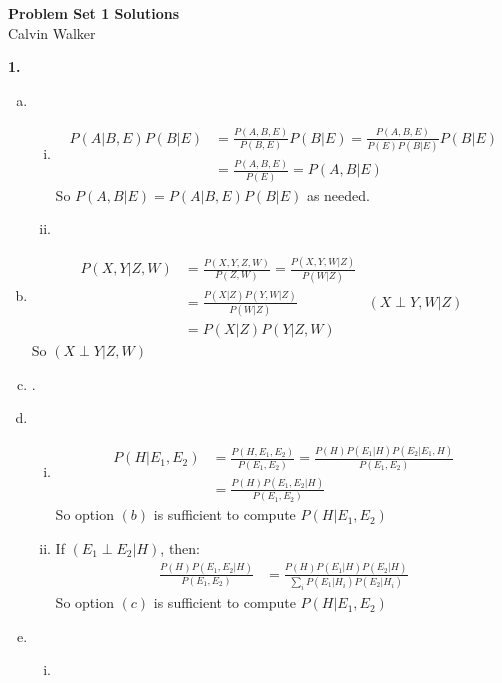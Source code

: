 \documentclass{article}
\begin{document}
\begin{center}
    \Large{\textbf{Problem Set 1 Solutions}} \\[0.25ex]
    Calvin Walker
\end{center}
\textbf{1.}
\begin{enumerate}[(a)]
    \item \begin{enumerate}[(i)]
        \item \begin{align*}
            P(A|B, E)P(B | E) &= \frac{P(A, B, E)}{P(B, E)}P(B|E) = \frac{P(A, B, E)}{P(E)P(B|E)}P(B|E) \\[0.5ex]
            &= \frac{P(A, B, E)}{P(E)} = P(A, B | E)
        \end{align*}
        So $P(A, B | E) =  P(A|B, E)P(B | E)$ as needed. 
        \item 
    \end{enumerate}
    \item \begin{align*}
        P(X, Y | Z, W) &= \frac{P(X, Y, Z, W)}{P(Z, W)} = \frac{P(X, Y, W|Z)}{P(W | Z)} \\ 
        &= \frac{P(X|Z)P(Y, W|Z)}{P(W|Z)} & (X \perp Y, W | Z) \\
        &= P(X|Z)P(Y|Z,W)
    \end{align*}
    So $(X \perp Y|Z, W)$
    \item .
    \item \begin{enumerate}[(i)]
        \item \begin{align*}
            P(H|E_1, E_2) &= \frac{P(H, E_1, E_2)}{P(E_1, E_2)} = \frac{P(H)P(E_1|H)P(E_2|E_1, H)}{P(E_1, E_2)} \\
            &= \frac{P(H)P(E_1, E_2 | H)}{P(E_1, E_2)}
        \end{align*}
        So option $(b)$ is sufficient to compute $P(H|E_1, E_2)$
        \item If $(E_1 \perp E_2 | H)$, then: \begin{align*}
            \frac{P(H)P(E_1, E_2 | H)}{P(E_1, E_2)} &= \frac{P(H)P(E_1|H) P(E_2 | H)}{\sum_{i}P(E_1|H_i)P(E_2|H_i)}
        \end{align*}
        So option $(c)$ is sufficient to compute $P(H|E_1, E_2)$
    \end{enumerate}
    \item \begin{enumerate}[(i)]
        \item \begin{align*}

\end{align*}
\end{enumerate}
\end{enumerate}
\end{document}

